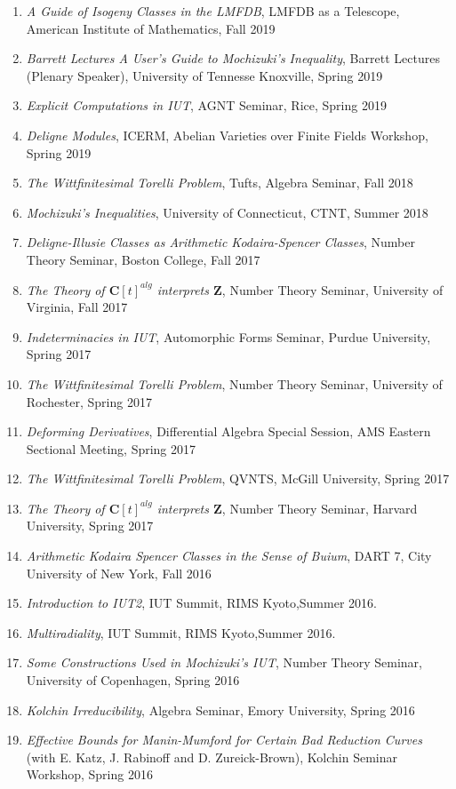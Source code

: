 \documentclass[a4paper,10pt]{article}
\newcommand{\CC}{\mathbf{C}}
\newcommand{\ZZ}{\mathbf{Z}}
\begin{document}
\begin{enumerate}
	\item \emph{A Guide of Isogeny Classes in the LMFDB}, LMFDB as a Telescope, American Institute of Mathematics, Fall 2019
	\item \emph{Barrett Lectures	A User's Guide to Mochizuki's Inequality}, Barrett Lectures (Plenary Speaker), University of Tennesse Knoxville, Spring 2019
	\item \emph{Explicit Computations in IUT}, AGNT Seminar, Rice, Spring 2019
	\item \emph{Deligne Modules}, ICERM, Abelian Varieties over Finite Fields Workshop, Spring 2019
	\item \emph{The Wittfinitesimal Torelli Problem}, Tufts, Algebra Seminar, Fall 2018
	\item \emph{Mochizuki's Inequalities}, University of Connecticut, CTNT, Summer 2018
	\item \emph{Deligne-Illusie Classes as Arithmetic Kodaira-Spencer Classes}, Number Theory Seminar, Boston College, Fall 2017
	\item \emph{The Theory of $\CC[t]^{alg}$ interprets $\ZZ$}, Number Theory Seminar, University of Virginia, Fall 2017
	\item \emph{Indeterminacies in IUT}, Automorphic Forms Seminar, Purdue University, Spring 2017
	\item \emph{The Wittfinitesimal Torelli Problem}, Number Theory Seminar, University of Rochester, Spring 2017 
	\item \emph{Deforming Derivatives}, Differential Algebra Special Session, AMS Eastern Sectional Meeting, Spring 2017
	\item \emph{The Wittfinitesimal Torelli Problem}, QVNTS, McGill University, Spring 2017 
	\item \emph{The Theory of $\CC[t]^{alg}$ interprets $\ZZ$}, Number Theory Seminar, Harvard University, Spring 2017
	\item \emph{Arithmetic Kodaira Spencer Classes in the Sense of Buium}, DART 7, City University of New York, Fall 2016 
	\item \emph{Introduction to IUT2}, IUT Summit, RIMS Kyoto,Summer 2016.
	\item \emph{Multiradiality},  IUT Summit, RIMS Kyoto,Summer 2016. 
	\item \emph{Some Constructions Used in Mochizuki's IUT},  Number Theory Seminar, University of Copenhagen,  Spring 2016
	\item \emph{Kolchin Irreducibility}, Algebra Seminar, Emory University, Spring 2016 
	\item \emph{Effective Bounds for Manin-Mumford for Certain Bad Reduction Curves} (with E. Katz, J. Rabinoff and D. Zureick-Brown), Kolchin Seminar Workshop, Spring 2016

\end{enumerate}
\end{document}
